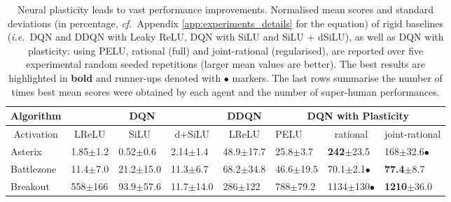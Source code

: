 \documentclass[accepted]{article}
\theoremstyle{plain}
\theoremstyle{definition}
\theoremstyle{remark}
\newcommand{\ie}{\emph{i.e.}~}
\newcommand{\cf}{\emph{cf.}~}
\begin{document}
\begin{table*}[t]
\vskip -0.09in
\caption{Neural plasticity leads to vast performance improvements. Normalised mean scores and standard deviations (in percentage, \cf Appendix \ref{app:experiments_details} for the equation) of rigid baselines (\ie DQN and DDQN with Leaky ReLU, DQN with SiLU and SiLU + dSiLU), as well as DQN with plasticity: using PELU, rational (full) and joint-rational (regularised), are reported over five experimental random seeded repetitions (larger mean values are better). The best results are highlighted in \textbf{bold} and runner-ups denoted with $\bullet$ markers. The last rows summarise the number of times best mean scores were obtained by each agent and the number of super-human performances.}
\label{tab:results}
\center
\begin{tabular}{@{}llllllll@{}}
\toprule
\multicolumn{1}{c}{Algorithm}    & \multicolumn{3}{c}{DQN}                                                                                      & \multicolumn{1}{c}{DDQN}                 & \multicolumn{3}{c}{DQN with Plasticity}                                                                                  \\ \midrule
\multicolumn{1}{c}{Activation} & \multicolumn{1}{c}{LReLU} & \multicolumn{1}{c}{SiLU}              & \multicolumn{1}{c}{d+SiLU}               & \multicolumn{1}{c}{LReLU}                & PELU                                  & \multicolumn{1}{c}{rational}               & \multicolumn{1}{c}{joint-rational}         \\ \midrule
Asterix                          & 1.85\tiny$\pm$1.2         & 0.52\tiny$\pm$0.6                     & \multicolumn{1}{l|}{2.14\tiny$\pm$1.4}   & \multicolumn{1}{l|}{48.9\tiny$\pm$17.7}  & 25.8\tiny$\pm$3.7                     & \textbf{242}\tiny$\pm$23.5             & 168\tiny$\pm$32.6\normalsize$\bullet$   \\
Battlezone                       & 11.4\tiny$\pm$7.0         & 21.2\tiny$\pm$15.0                    & \multicolumn{1}{l|}{11.3\tiny$\pm$6.7}   & \multicolumn{1}{l|}{68.2\tiny$\pm$34.8}  & 46.6\tiny$\pm$19.5                    & 70.1\tiny$\pm$2.1\normalsize$\bullet$  & \textbf{77.4}\tiny$\pm$8.7              \\
Breakout                         & 558\tiny$\pm$166          & 93.9\tiny$\pm$57.6                    & \multicolumn{1}{l|}{11.7\tiny$\pm$14.0}  & \multicolumn{1}{l|}{286\tiny$\pm$122}    & 788\tiny$\pm$79.2                     & 1134\tiny$\pm$130\normalsize$\bullet$  & \textbf{1210}\tiny$\pm$36.0             \\

\end{tabular}
\end{table*}
\end{document}
